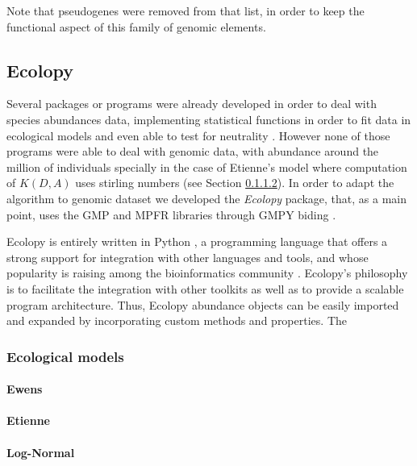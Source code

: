 Note that pseudogenes were removed from that list, in order to keep the functional aspect of this family of genomic elements.

\subsection{Ecolopy}

Several packages or programs were already developed in order to deal with species abundances data, implementing statistical functions in order to fit data in ecological models and even able to test for neutrality \cite{Jabot2011,Etienne2007,Hankin2007}. However none of those programs were able to deal with genomic data, with abundance around the million of individuals specially in the case of Etienne's model where computation of $K(D,A)$ uses stirling numbers (see Section \ref{sec:etienne-model}). In order to adapt the algorithm to genomic dataset we developed the \textit{Ecolopy} package, that, as a main point, uses the GMP \cite{Granlund2000} and MPFR \cite{Fousse2007} libraries through GMPY biding \cite{Martelli2007}.

Ecolopy is entirely written in Python \cite{VanRossum1991}, a programming language that offers a strong support for integration with other languages and tools, and whose popularity is raising among the bioinformatics community \cite{Bassi2007}. Ecolopy's philosophy is to facilitate the integration with other toolkits as well as to provide a scalable program architecture. Thus, Ecolopy abundance objects can be easily imported and expanded by incorporating custom methods and properties. The

\subsubsection{Ecological models}

\paragraph{Ewens}

\paragraph{Etienne}
\label{sec:etienne-model}

\paragraph{Log-Normal}

